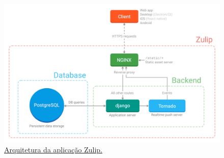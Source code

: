 \documentclass[11pt,a4paper]{report}%
\begin{document}
\begin{figure}[H]
	\centering
	\includegraphics[scale=0.28]{architecture.png}
	\caption{\href{https://zulip.readthedocs.io/en/latest/overview/architecture-overview.html}{Arquitetura da aplicação Zulip.}}
	\label{img:arquitetura-zulip}
\end{figure}
\end{document}
